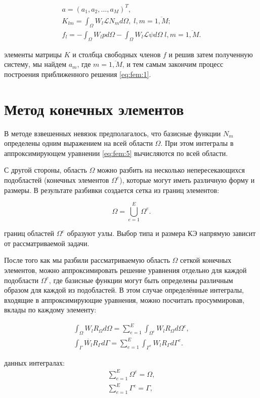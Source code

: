 \documentclass[14pt]{extreport}
\begin{document}

\begin{gather}
a = (a_1,a_2,\dots, a_M)^T, \\
K_{lm}=\int_\Omega W_l \mathcal L N_m  d\Omega, \; l,m=\overline{1,M}; \\
f_l=-\int_\Omega W_l p d \Omega-\int_\Omega W_l \mathcal L \psi d \Omega \; l,m=\overline{1,M}.
\end{gather}

 элементы матрицы $K$ и столбца свободных членов $f$ и решив затем полученную систему, мы найдем $a_m$, где $m=\overline{1,M}$, и тем самым закончим процесс построения приближенного решения \ref{eq:fem:1}.

\section{Метод конечных элементов}
В методе взвешенных невязок предполагалось, что базисные функции $N_m$ определены одним выражением на всей области $\Omega$. При этом интегралы в аппроксимирующем уравнении \ref{eq:fem:5} вычисляются по всей области.

С другой стороны, область $\Omega$ можно разбить на несколько непересекающихся подобластей (конечных элементов $\Omega^e$), которые могут иметь различную форму и размеры. В результате разбивки создается сетка из границ элементов:

$$\Omega=\bigcup\limits_{e=1}^E\Omega^{e}.$$


 границ областей $\Omega^{e}$ образуют узлы. Выбор типа и размера КЭ напрямую зависит от рассматриваемой задачи.

После того как мы разбили рассматриваемую область $\Omega$ сеткой конечных элементов, можно аппроксимировать решение уравнения отдельно для каждой подобласти $\Omega^{e}$, где базисные функции могут быть определены различным образом для каждой из подобластей. В этом случае определённые интегралы, входящие в аппроксимирующие уравнения, можно посчитать просуммировав, вклады по каждому элементу:

\begin{gather}
\int_\Omega W_l R_\Omega d\Omega = \sum\limits_{e=1}^E\int_{\Omega^{e}} W_l R_\Omega d\Omega^e, \nonumber\\
\int_\Gamma \overline{W_l} R_\Gamma d\Gamma = \sum\limits_{e=1}^E\int_{\Gamma^{e}} W_l R_\Gamma d\Gamma^e.
\end{gather}

 данных интегралах:
\begin{gather}
\sum\limits_{e=1}^E\Omega^e=\Omega, \\
\sum\limits_{e=1}^E\Gamma^e=\Gamma,
\end{gather}
\end{document}
